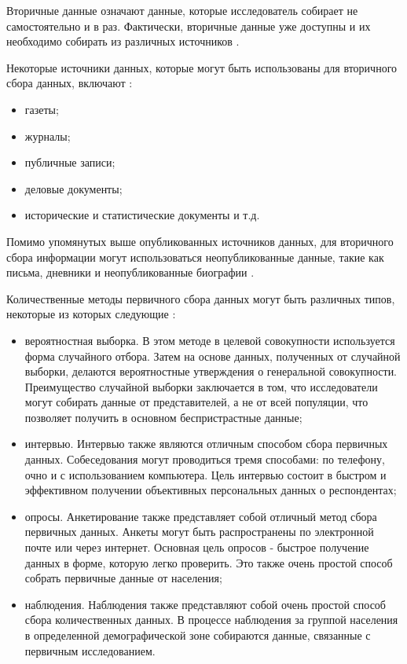 Вторичные данные означают данные, которые исследователь собирает не самостоятельно и в 
раз. Фактически, вторичные данные уже доступны и их необходимо собирать из различных 
источников .

Некоторые источники данных, которые могут быть использованы для вторичного сбора данных, 
включают :

\begin{itemize}
	\item газеты;
	\item журналы;
	\item публичные записи;
	\item деловые документы;
	\item исторические и статистические документы и т.д.
\end{itemize}

Помимо упомянутых выше опубликованных источников данных, для вторичного сбора информации могут использоваться неопубликованные данные, такие как письма, дневники и неопубликованные биографии .

Количественные методы первичного сбора данных могут быть различных типов, некоторые из 
которых следующие :

\begin{itemize}
	\item вероятностная выборка. В этом методе в целевой совокупности используется форма случайного отбора. Затем на основе данных, полученных от случайной выборки, делаются вероятностные утверждения о генеральной совокупности. Преимущество случайной выборки заключается в том, что исследователи могут собирать данные от представителей, а не от всей популяции, что позволяет получить в основном беспристрастные данные;
	\item интервью. Интервью также являются отличным способом сбора первичных данных. Собеседования могут проводиться тремя способами: по телефону, очно и с использованием компьютера. Цель интервью состоит в быстром и эффективном получении объективных персональных данных о респондентах;
	\item опросы. Анкетирование также представляет собой отличный метод сбора первичных данных. Анкеты могут быть распространены по электронной почте или через интернет. Основная цель опросов - быстрое получение данных в форме, которую легко проверить. Это также очень простой способ собрать первичные данные от населения;
	\item наблюдения. Наблюдения также представляют собой очень простой способ сбора количественных данных. В процессе наблюдения за группой населения в определенной демографической зоне собираются данные, связанные с первичным исследованием. 
\end{itemize}

